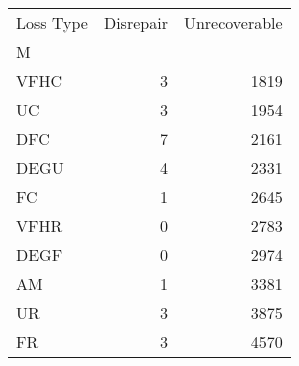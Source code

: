 \begin{tabular}{lrr}
\toprule
Loss Type &  Disrepair &  Unrecoverable \\
M    &            &                \\
\midrule
VFHC &          3 &           1819 \\
UC   &          3 &           1954 \\
DFC  &          7 &           2161 \\
DEGU &          4 &           2331 \\
FC   &          1 &           2645 \\
VFHR &          0 &           2783 \\
DEGF &          0 &           2974 \\
AM   &          1 &           3381 \\
UR   &          3 &           3875 \\
FR   &          3 &           4570 \\
\bottomrule
\end{tabular}
